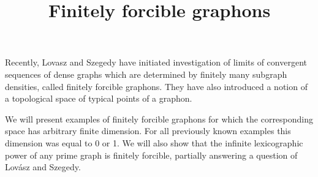 \title{Finitely forcible graphons}
\endtitle

Recently, Lovasz and Szegedy have initiated investigation of limits of
convergent sequences of dense graphs which are determined by finitely
many subgraph densities, called finitely forcible graphons. They have
also introduced a notion of a topological space of typical points of a
graphon.

We will present examples of finitely forcible graphons for which the
corresponding space has arbitrary finite dimension. For all previously
known examples this dimension was equal to 0 or 1. We will also show
that the infinite lexicographic power of any prime graph is finitely
forcible, partially answering a question of Lov\'asz and Szegedy.